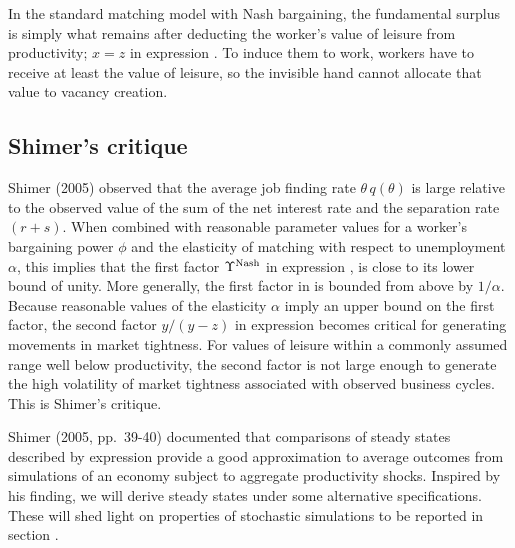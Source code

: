 In
the standard matching model with Nash bargaining, the fundamental surplus
is simply what remains  after deducting  the worker's value
of leisure from productivity; $x=z$ in expression .
To induce  them  to work, workers have to receive at least  the
value of  leisure, so the invisible hand cannot allocate  that value to
vacancy creation.


\subsection{Shimer's  critique}
%
Shimer  (2005) observed that  the average job finding rate
$\theta\, q(\theta)$ is large relative to the observed value of
the sum   of the net interest rate and the separation rate $(r+s)$. When
 combined with reasonable parameter values for a worker's
bargaining power $\phi$ and the elasticity of matching with
respect to unemployment $\alpha$, this  implies that the first factor
$\Upsilon^{\rm Nash}$ in expression ,
is close to
its lower bound of unity. More generally,
the first
factor in  is bounded from above by $1/\alpha$.
Because reasonable values of the elasticity $\alpha$ imply an upper bound on
the first factor,  the second factor
$y/(y-z)$ in expression  becomes
critical for  generating movements in market tightness.
For values of leisure within a commonly assumed range
well below productivity, the second factor is not large
enough to generate the high volatility of market
tightness associated with observed business cycles. This is  Shimer's critique.


Shimer (2005, pp.\ 39-40)  documented that comparisons of steady states described by   expression
provide a good approximation to average outcomes from
simulations of an economy subject to aggregate productivity shocks.
Inspired by his finding, we will
derive  steady states under some alternative specifications. These
will shed light on properties of stochastic simulations
to be reported in section .     %





